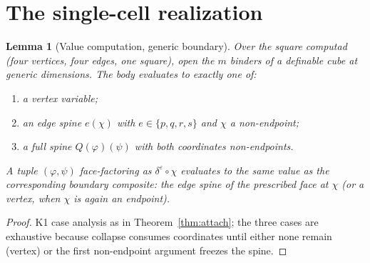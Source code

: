 \documentclass[11pt]{amsart}
\newtheorem{lem}[thm]{Lemma}
\theoremstyle{definition}
\begin{document}
\section{The single-cell realization}
\label{sec:single}

\begin{lem}[Value computation, generic boundary]\label{lem:value}
  Over the square computad (four vertices, four edges, one square),
  open the $m$ binders of a definable cube at generic dimensions.
  The body evaluates to exactly one of:
  \begin{enumerate}
  \item a vertex variable;
  \item an edge spine $e(\chi)$ with $e \in \{p,q,r,s\}$ and $\chi$
    a non-endpoint;
  \item a full spine $Q(\varphi)(\psi)$ with both coordinates
    non-endpoints.
  \end{enumerate}
  A tuple $(\varphi,\psi)$ face-factoring as
  $\delta^\varepsilon \circ \chi$ evaluates to the \emph{same
  value} as the corresponding boundary composite: the edge spine of
  the prescribed face at $\chi$ (or a vertex, when $\chi$ is again
  an endpoint).
\end{lem}
\begin{proof}
  K1 case analysis as in Theorem~\ref{thm:attach}; the three cases
  are exhaustive because collapse consumes coordinates until either
  none remain (vertex) or the first non-endpoint argument freezes
  the spine.
\end{proof}
\end{document}
